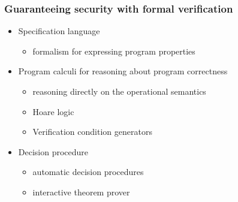 \documentclass{beamer}
\begin{document}
\begin{frame}\frametitle{Guaranteeing security with formal verification}
  \begin{itemize}
    \item Specification language 
         \begin{itemize}
	    \item formalism for expressing program properties
	  \end{itemize}
    \item Program calculi for reasoning about program correctness 
       \begin{itemize}
	  \item reasoning directly on the operational semantics
	  \item Hoare logic  
	  \item Verification condition generators
       \end{itemize}
    \item Decision procedure 
        \begin{itemize}
	    \item automatic decision procedures
	    \item interactive theorem prover
	\end{itemize}
  \end{itemize}
\end{frame}
\end{document}
